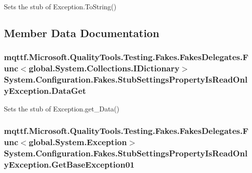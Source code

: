 Sets the stub of Exception.\-To\-String()



\subsection{Member Data Documentation}
\hypertarget{class_system_1_1_configuration_1_1_fakes_1_1_stub_settings_property_is_read_only_exception_a3c02644b43b56550f9504125bcae4ab2}{
\subsubsection[{Data\-Get}]{\setlength{\rightskip}{0pt plus 5cm}mqttf.\-Microsoft.\-Quality\-Tools.\-Testing.\-Fakes.\-Fakes\-Delegates.\-Func$<$global.\-System.\-Collections.\-I\-Dictionary$>$ System.\-Configuration.\-Fakes.\-Stub\-Settings\-Property\-Is\-Read\-Only\-Exception.\-Data\-Get}}\label{class_system_1_1_configuration_1_1_fakes_1_1_stub_settings_property_is_read_only_exception_a3c02644b43b56550f9504125bcae4ab2}


Sets the stub of Exception.\-get\-\_\-\-Data()

\hypertarget{class_system_1_1_configuration_1_1_fakes_1_1_stub_settings_property_is_read_only_exception_a7ba933459b78ac35cb2b4293a4a0953a}{
\subsubsection[{Get\-Base\-Exception01}]{\setlength{\rightskip}{0pt plus 5cm}mqttf.\-Microsoft.\-Quality\-Tools.\-Testing.\-Fakes.\-Fakes\-Delegates.\-Func$<$global.\-System.\-Exception$>$ System.\-Configuration.\-Fakes.\-Stub\-Settings\-Property\-Is\-Read\-Only\-Exception.\-Get\-Base\-Exception01}}\label{class_system_1_1_configuration_1_1_fakes_1_1_stub_settings_property_is_read_only_exception_a7ba933459b78ac35cb2b4293a4a0953a}



